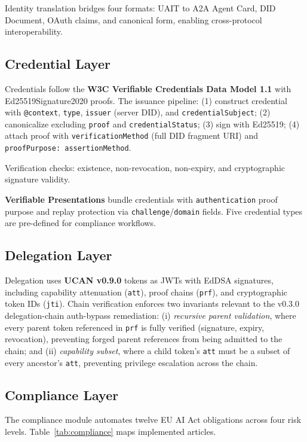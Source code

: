 \documentclass[conference]{IEEEtran}
\begin{document}
Identity translation bridges four formats: UAIT to A2A Agent Card, DID Document, OAuth claims, and canonical form, enabling cross-protocol interoperability.

\subsection{Credential Layer}

Credentials follow the \textbf{W3C Verifiable Credentials Data Model 1.1} with Ed25519Signature2020 proofs. The issuance pipeline: (1) construct credential with \texttt{@context}, \texttt{type}, \texttt{issuer} (server DID), and \texttt{credentialSubject}; (2) canonicalize excluding \texttt{proof} and \texttt{credentialStatus}; (3) sign with Ed25519; (4) attach proof with \texttt{verificationMethod} (full DID fragment URI) and \texttt{proofPurpose: assertionMethod}.

Verification checks: existence, non-revocation, non-expiry, and cryptographic signature validity.

\textbf{Verifiable Presentations} bundle credentials with \texttt{authentication} proof purpose and replay protection via \texttt{challenge}/\texttt{domain} fields. Five credential types are pre-defined for compliance workflows.

\subsection{Delegation Layer}

Delegation uses \textbf{UCAN v0.9.0} tokens as JWTs with EdDSA signatures, including capability attenuation (\texttt{att}), proof chains (\texttt{prf}), and cryptographic token IDs (\texttt{jti}). Chain verification enforces two invariants relevant to the v0.3.0 delegation-chain auth-bypass remediation: (i) \emph{recursive parent validation}, where every parent token referenced in \texttt{prf} is fully verified (signature, expiry, revocation), preventing forged parent references from being admitted to the chain; and (ii) \emph{capability subset}, where a child token's \texttt{att} must be a subset of every ancestor's \texttt{att}, preventing privilege escalation across the chain.

\subsection{Compliance Layer}

The compliance module automates twelve EU AI Act obligations across four risk levels. Table~\ref{tab:compliance} maps implemented articles.
\end{document}
